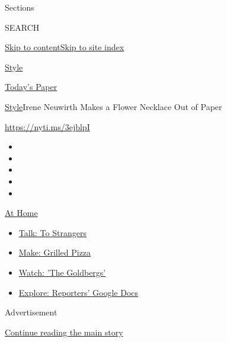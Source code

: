 Sections

SEARCH

\protect\hyperlink{site-content}{Skip to
content}\protect\hyperlink{site-index}{Skip to site index}

\href{https://www.nytimes.com/section/style}{Style}

\href{https://myaccount.nytimes.com/auth/login?response_type=cookie\&client_id=vi}{}

\href{https://www.nytimes.com/section/todayspaper}{Today's Paper}

\href{/section/style}{Style}\textbar{}Irene Neuwirth Makes a Flower
Necklace Out of Paper

\url{https://nyti.ms/3ejblpI}

\begin{itemize}
\item
\item
\item
\item
\item
\end{itemize}

\href{https://www.nytimes.com/spotlight/at-home?action=click\&pgtype=Article\&state=default\&region=TOP_BANNER\&context=at_home_menu}{At
Home}

\begin{itemize}
\tightlist
\item
  \href{https://www.nytimes.com/2020/08/03/well/family/the-benefits-of-talking-to-strangers.html?action=click\&pgtype=Article\&state=default\&region=TOP_BANNER\&context=at_home_menu}{Talk:
  To Strangers}
\item
  \href{https://www.nytimes.com/2020/08/01/at-home/coronavirus-make-pizza-on-a-grill.html?action=click\&pgtype=Article\&state=default\&region=TOP_BANNER\&context=at_home_menu}{Make:
  Grilled Pizza}
\item
  \href{https://www.nytimes.com/2020/07/31/arts/television/goldbergs-abc-stream.html?action=click\&pgtype=Article\&state=default\&region=TOP_BANNER\&context=at_home_menu}{Watch:
  'The Goldbergs'}
\item
  \href{https://www.nytimes.com/interactive/2020/at-home/even-more-reporters-editors-diaries-lists-recommendations.html?action=click\&pgtype=Article\&state=default\&region=TOP_BANNER\&context=at_home_menu}{Explore:
  Reporters' Google Docs}
\end{itemize}

Advertisement

\protect\hyperlink{after-top}{Continue reading the main story}

